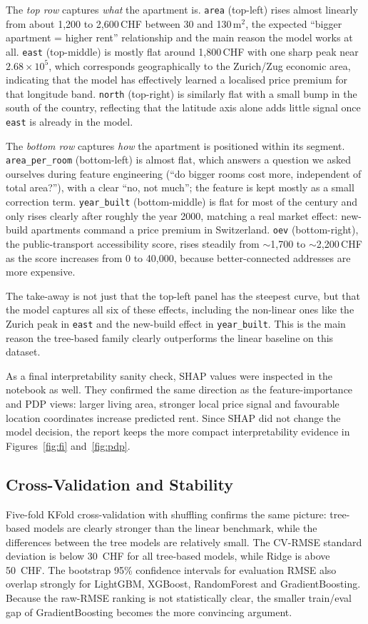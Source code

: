 \documentclass[11pt,a4paper]{article}
\begin{document}
The \emph{top row} captures \emph{what} the apartment is. \texttt{area} (top-left) rises almost linearly from about 1{,}200 to 2{,}600\,CHF between 30 and 130\,m$^2$, the expected ``bigger apartment = higher rent'' relationship and the main reason the model works at all. \texttt{east} (top-middle) is mostly flat around 1{,}800\,CHF with one sharp peak near $2.68 \times 10^5$, which corresponds geographically to the Zurich/Zug economic area, indicating that the model has effectively learned a localised price premium for that longitude band. \texttt{north} (top-right) is similarly flat with a small bump in the south of the country, reflecting that the latitude axis alone adds little signal once \texttt{east} is already in the model.

The \emph{bottom row} captures \emph{how} the apartment is positioned within its segment. \texttt{area\_per\_room} (bottom-left) is almost flat, which answers a question we asked ourselves during feature engineering (``do bigger rooms cost more, independent of total area?''), with a clear ``no, not much''; the feature is kept mostly as a small correction term. \texttt{year\_built} (bottom-middle) is flat for most of the century and only rises clearly after roughly the year 2000, matching a real market effect: new-build apartments command a price premium in Switzerland. \texttt{oev} (bottom-right), the public-transport accessibility score, rises steadily from $\sim$1{,}700 to $\sim$2{,}200\,CHF as the score increases from 0 to 40{,}000, because better-connected addresses are more expensive.

The take-away is not just that the top-left panel has the steepest curve, but that the model captures all six of these effects, including the non-linear ones like the Zurich peak in \texttt{east} and the new-build effect in \texttt{year\_built}. This is the main reason the tree-based family clearly outperforms the linear baseline on this dataset.

As a final interpretability sanity check, SHAP values were inspected in the notebook as well. They confirmed the same direction as the feature-importance and PDP views: larger living area, stronger local price signal and favourable location coordinates increase predicted rent. Since SHAP did not change the model decision, the report keeps the more compact interpretability evidence in Figures~\ref{fig:fi} and~\ref{fig:pdp}.


\subsection{Cross-Validation and Stability}
Five-fold KFold cross-validation with shuffling confirms the same picture: tree-based models are clearly stronger than the linear benchmark, while the differences between the tree models are relatively small. The CV-RMSE standard deviation is below 30~CHF for all tree-based models, while Ridge is above 50~CHF. The bootstrap 95\% confidence intervals for evaluation RMSE also overlap strongly for LightGBM, XGBoost, RandomForest and GradientBoosting. Because the raw-RMSE ranking is not statistically clear, the smaller train/eval gap of GradientBoosting becomes the more convincing argument.
\end{document}
